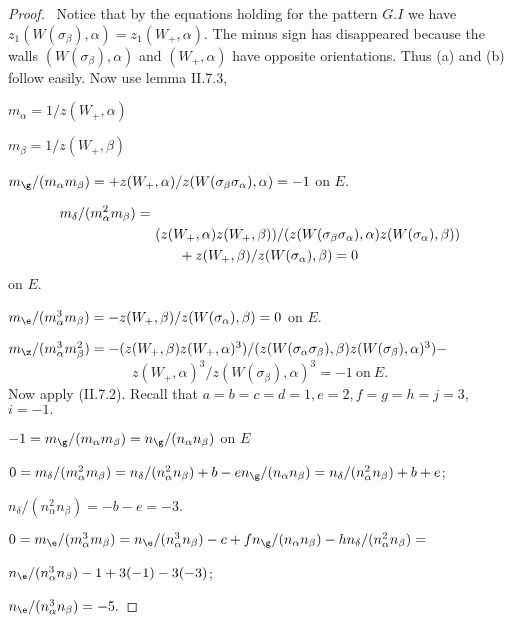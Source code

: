 \documentclass{memo-l}
\theoremstyle{definition}
\theoremstyle{remark}
\numberwithin{section}{chapter}
\numberwithin{equation}{chapter}
\begin{document}
\begin{proof} \   Notice that by the equations holding for the pattern $G.I$ we 
have $z_{1}(W({\sigma}_{\beta}),{\alpha}) = z_{1}(W_{+},{\alpha})$. 
 The minus sign has disappeared because the walls $(W({\sigma}_{\beta}),
{\alpha})$ and $(W_{+},{\alpha})$ have opposite orientations. 
 Thus (a) and (b) follow easily.  Now use lemma II.7.3,

\noindent
$m_{\alpha} = 1/z(W_{+},{\alpha})$

\noindent
$m_{\beta} = 1/z(W_{+},{\beta})$

\noindent
$m_{{\g}}/(m_{\alpha}m_{\beta}) = +z(W_{+},
{\alpha})/z(W({\sigma}_{\beta}{\sigma}_{\alpha}),{\alpha}) = -1$ on $E$.

$$\aligned
m_{{\delta}}/(m_{\alpha}^{2}m_{\beta}) =& \\ 
&\ (z(W_{+},{\alpha})z(W_{+},{\beta}))/(z(W({\sigma}_{\beta}{\sigma}_{\alpha}),
{\alpha})z(W({\sigma}_{\alpha}),{\beta})) \\
&\quad\quad  + 
z(W_{+},{\beta})/z(W({\sigma}_{\alpha}),{\beta}) = 0
\endaligned $$ on $E$.

\noindent
$m_{{\e}}/(m_{\alpha}^{3}m_{\beta}) = 
-z(W_{+},{\beta})/z(W({\sigma}_{\alpha}),{\beta}) = 0$ on $E$.

\noindent
$m_{{\z}}/(m_{\alpha}^{3}m_{\beta}^{2}) = 
-(z(W_{+},{\beta})z(W_{+},{\alpha})^{3})/(z(W({\sigma}_{\alpha}
{\sigma}_{\beta}),{\beta})z(W({\sigma}_{\beta}),{\alpha})^{3}) - $
$$
z(W_{+},{\alpha})^{3}/z(W({\sigma}_{\beta}),{\alpha})^{3} = -1\ 
{\text{on}}\  E	.
$$
Now apply (II.7.2).  Recall that $a = b = c = d = 1, e = 2, f = g = h = j = 3,$
$i=-1.$

\noindent
$-1 =   m_{{\g}}/(m_{\alpha}m_{\beta}) = 
n_{{\g}}/(n_{\alpha}n_{\beta})$ on $E$

\noindent
$0 = m_{{\delta}}/(m_{\alpha}^{2}m_{\beta}) = 
n_{{\delta}}/(n_{\alpha}^{2}n_{\beta}) + 
b -en_{{\g}}/(n_{\alpha}n_{\beta}) = 
n_{{\delta}}/(n_{\alpha}^{2}n_{\beta}) + b + e$;

   $n_{{\delta}}/(n_{\alpha}^{2}n_{\beta}) = -b -e = -3$.

\noindent
$0 = m_{{\e}}/(m_{\alpha}^{3}m_{\beta}) = 
n_{{\e}}/(n_{\alpha}^{3}n_{\beta}) - c + 
fn_{{\g}}/(n_{\alpha}n_{\beta}) - hn_{{\delta}}/(n_{\alpha}^{2}
n_{\beta}) =$ 
    
$n_{{\e}}/(n_{\alpha}^{3}n_{\beta}) -1 + 3(-1) - 3(-3)$;

$n_{{\e}}/(n_{\alpha}^{3}n_{\beta}) = -5.$

\medskip


\end{proof}
\end{document}
